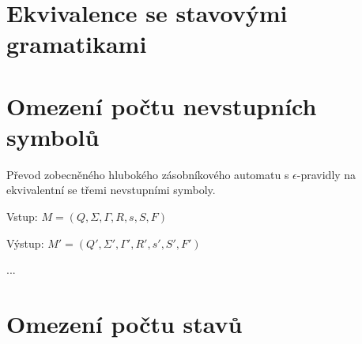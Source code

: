 \section{Ekvivalence se stavovými gramatikami}


\section{Omezení počtu nevstupních symbolů}


\begin{Alg}
Převod zobecněného hlubokého zásobníkového automatu s $\epsilon$-pravidly na ekvivalentní se třemi nevstupními symboly.

\begin{list}{}{\setlength\parsep{0cm} \setlength\itemsep{0cm} \setlength\leftmargin{1em}}
   \item Vstup: $M = (Q,\Sigma,\Gamma, R, s, S, F)$ 
   \item Výstup: $M' = (Q', \Sigma', {\Gamma}', R', s',  S', F')$ \medskip
  
  \item ...

\end{list}
\end{Alg}



\section{Omezení počtu stavů}


